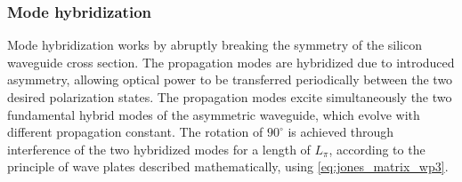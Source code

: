 \documentclass[../report.tex]{subfiles}
\begin{document}
			\subsubsection{Mode hybridization}
Mode hybridization works by abruptly breaking the symmetry of the silicon waveguide cross section. The propagation modes are hybridized due to introduced asymmetry, allowing optical power to be transferred periodically between the two desired polarization states. The propagation modes excite simultaneously the two fundamental hybrid modes of the asymmetric waveguide, which evolve with different propagation constant. The rotation of $90^{\circ}$ is achieved through interference of the two hybridized modes for a length of $L_{\pi}$, according to the principle of wave plates described mathematically, using \ref{eq:jones_matrix_wp3}. 
\end{document}
